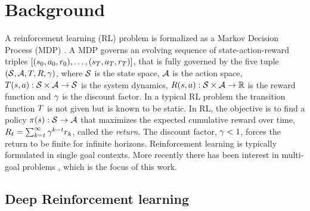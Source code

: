 \section{Background}

A reinforcement learning (RL) problem is formalized as a Markov Decision Process (MDP)
\citep{sutton1998reinforcement}. A MDP governs
an evolving sequence of state-action-reward triples $[(s_0, a_0,
r_0), \dots, (s_T, a_T, r_T)]$, that is fully governed
by the five tuple $(\mathcal{S}, \mathcal{A}, T, R, \gamma)$, where $\mathcal{S}$ is the
state space, $\mathcal{A}$ is the action space, $T(s,a) : \mathcal{S} \times \mathcal{A}
\rightarrow \mathcal{S}$ is the system dynamics, $R(s, a) : \mathcal{S} \times \mathcal{A}
\rightarrow \mathbb{R} $ is the reward function and $\gamma$ is the discount
factor.
In a typical RL problem the transition function $T$ is not given but is
known to be static.
In RL, the objective is to find a policy $\pi(s): \mathcal{S}
\rightarrow \mathcal{A}$ that
maximizes the expected cumulative
reward over time, $R_t = \sum_{k=t}^{\infty} \gamma^{k-t}r_{k}$, called the
\emph{return}. The discount factor, $\gamma < 1$, forces
the return to be finite for infinite horizons.  
Reinforcement learning is typically formulated in single goal
contexts. More recently there has been interest in multi-goal
problems
\citep{andrychowicz2017hindsight,pong2018temporal,plappert2018multi}, which is
the focus of this work.


\subsection{Deep Reinforcement learning}

